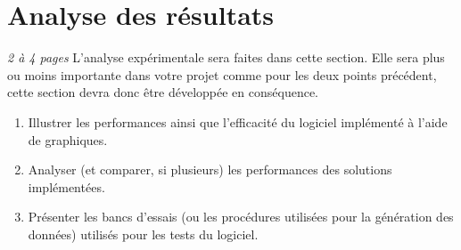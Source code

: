 \documentclass[a4paper]{article}
\begin{document}
\section{Analyse des résultats }
\emph{2 à 4 pages}
L'analyse expérimentale sera faites dans cette section.   Elle sera plus ou moins importante dans votre projet comme pour les deux points précédent, cette section devra donc être développée en conséquence.

\begin{enumerate}%
\item 	Illustrer les performances ainsi que l'efficacité du logiciel implémenté à l'aide de graphiques.
\item Analyser (et comparer, si plusieurs) les performances des solutions implémentées.
\item	Présenter les bancs d'essais (ou les procédures utilisées pour la génération des données) utilisés pour les tests du logiciel.
\end{enumerate}
\end{document}
